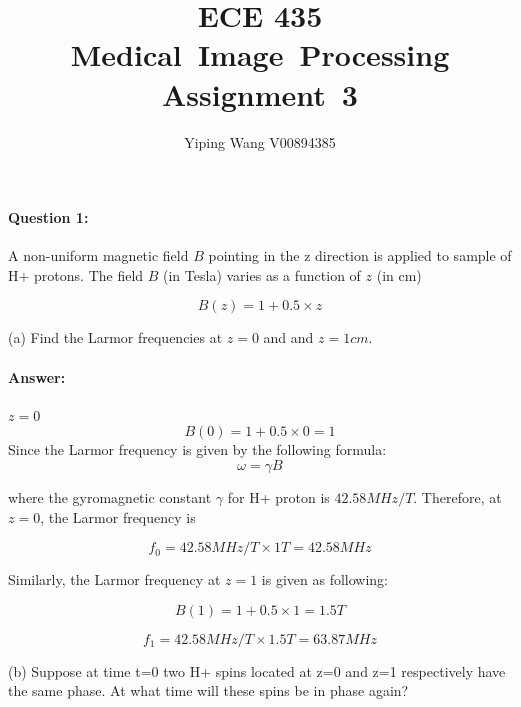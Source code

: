 \documentclass[12pt, letter]{article}
\newcommand{\courseName}{ECE 435 Medical~Image~Processing}
\newcommand{\assignName}{Assignment~3}
\begin{document}
\pagestyle{titlesec_assignment}

\title{\courseName\\\assignName}
\author{Yiping Wang V00894385}
\maketitle

\paragraph{Question 1: } A non-uniform magnetic field $B$ pointing in the z direction is applied to sample of H+ protons. The field $B$ (in Tesla) varies as a function of $z$ (in cm)

\begin{equation}
    B(z) = 1 + 0.5 \times z
\end{equation}

(a) Find the Larmor frequencies at $z=0$ and and $z=1 cm$.

\paragraph{Answer: } $z=0$
\begin{equation}
    B(0) = 1 + 0.5 \times 0 = 1
\end{equation}
Since the Larmor frequency is given by the following formula:
\begin{equation}
    \omega = \gamma B
\end{equation}

where the gyromagnetic constant $\gamma$ for H+ proton is $42.58 MHz/T$. Therefore, at $z=0$, the Larmor frequency is 

\begin{equation}
    f_0 = 42.58 MHz/T \times 1T = 42.58 MHz
\end{equation}


Similarly, the Larmor frequency at $z=1$ is given as following:

\begin{equation}
    B(1) = 1 + 0.5 \times 1 = 1.5 T
\end{equation}

\begin{equation}
    f_1 = 42.58 MHz/T \times 1.5T = 63.87 MHz
\end{equation}

(b) Suppose at time t=0 two H+ spins located at z=0 and z=1 respectively have the same phase. At what time will these spins be in phase again?
\end{document}
